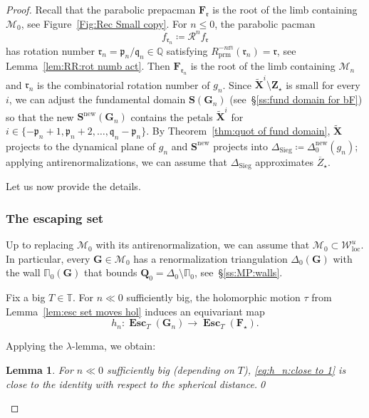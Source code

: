 \documentclass{amsart}
\newcommand{\1}{{\mathbb 1 }}
\newcommand\MM{\mathscr{M}}
\newcommand\bMM{{\pmb {\MM}}}
\newcommand\PT{\mathbb{ T}}
\newcommand{\bDelta}{{\mathbb{\Delta}}}
\newcommand{\bPi}{{\mathbb{\Pi}}}
\newcommand\RR{\mathcal{R}}
\newcommand\prm{{\operatorname{prm}}}
\newcommand\cRRc{R_{\prm}}%
\newcommand{\bF}{{\mathbf F}}
\newcommand{\bZ}{{\mathbf Z}}
\newcommand{\bX}{{\mathbf X}}
\newcommand{\bQ}{{\mathbf Q}}
\newcommand{\bS}{{\mathbf S}}
\newcommand{\bG}{{\mathbf G}}
\newcommand{\str}{{\star}}
\newcommand{\mm}{\mathbb{m}}
\newcommand{\pp}{\mathfrak{p}}
\renewcommand{\qq}{\mathfrak{q}}
\newcommand{\rr}{\mathfrak{r}}
\def\loc{{\mathrm{loc}}}
\newcommand\UnstLoc{{\boldsymbol{\mathcal{W}}^u_\loc}}
\newcommand\new{{\operatorname{new}}}
\newcommand\Sieg{{\operatorname{Sieg}}}
\newcommand{\Q}{\mathbb{Q}}
\newtheorem{lem}[thm]{Lemma}
\theoremstyle{remark}
\numberwithin{equation}{section}
\theoremstyle{definition}
\newcommand{\Esc}{{\boldsymbol{\operatorname{Esc}}}}
\theoremstyle{nonumberbreak}
\begin{document}
\begin{proof}
Recall that the parabolic prepacman $\bF_\rr$ is the root of the limb containing $\bMM_0$, see Figure~\ref{Fig:Rec Small copy}. For $n\le 0$, the parabolic pacman 
\begin{equation}
\label{eq:f rr_n}
f_{\rr_n}\coloneqq \RR^n f_\rr
\end{equation}
 has rotation number $\rr_n=\pp_n/\qq_n\in\Q$ satisfying $\cRRc^{-n \mm }(\rr_n)=\rr$, see Lemma~\ref{lem:RR:rot numb act}. Then $\bF_{\rr_n}$ is the root of the limb containing $\bMM_n$ and $\rr_n$ is the combinatorial rotation number of $g_n$. Since  $\widetilde \bX^i\setminus \bZ_\str$ is small for every $i$, we can adjust the fundamental domain $\bS(\bG_n)$ (see~\S\ref{ss:fund domain for bF}) so that the new $\bS^\new(\bG_n)$ contains the petals $\widetilde \bX^i$ for $i\in \{-\pp_n+1,\pp_n+2,\dots , \qq_n-\pp_n\}$. By Theorem~\ref{thm:quot of fund domain}, $\widetilde \bX$ projects to the dynamical plane of $g_n$ and $\bS^\new$ projects into $\bDelta_\Sieg\coloneqq \bDelta_0^\new(g_n)$; applying antirenormalizations, we can assume that $\bDelta_\Sieg$ approximates $\overline Z_\str$. 
 
 Let us now provide the details.
\subsubsection{The escaping set} Up to replacing $\bMM_0$ with its antirenormalization, we can assume that ${\bMM_0\subset \UnstLoc}$. In particular, every $\bG\in \bMM_0$ has a renormalization triangulation $\bDelta_0(\bG)$ with the wall $\bPi_0(\bG)$ that bounds $\bQ_0=\bDelta_0\setminus \bPi_0$, see~\S\ref{ss:MP:walls}.


Fix a big $T\in \PT$. For $n\ll0$ sufficiently big,  the holomorphic motion $\tau$ from  Lemma~\ref{lem:esc set moves hol} induces an equivariant map 
\begin{equation}
\label{eq:h_n:close to 1}
h_n \colon \Esc_T(\bG_n)\to \Esc_T(\bF_\str).
\end{equation}

Applying the $\lambda$-lemma, we obtain:
\begin{lem}
\label{lem:Esc bG_n is close to Fstr}
For $n\ll 0$ sufficiently big (depending on $T$), \eqref{eq:h_n:close to 1} is close to the identity with respect to the spherical distance.\qed
\end{lem} 
 
 

\end{proof}
\end{document}
